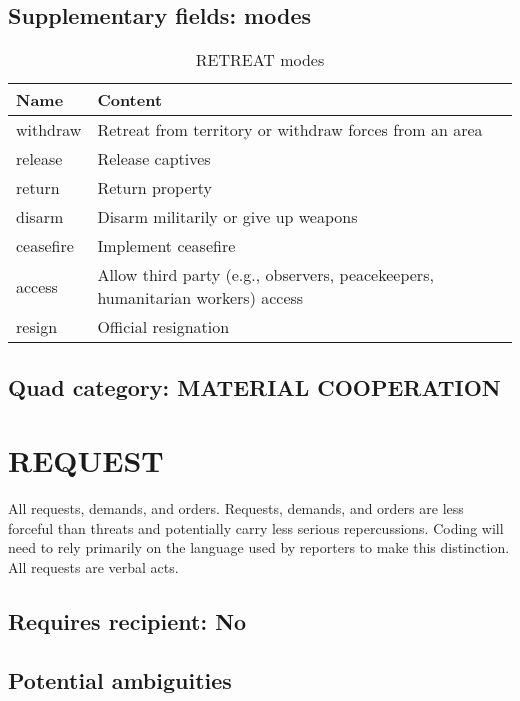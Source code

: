 \documentclass[11pt]{report}
\begin{document}
\subsection{Supplementary fields: modes}

\begin{table}[htp]
\caption{RETREAT modes}
\begin{center}
\begin{tabular}{|l|p{13cm}|}
\hline
Name & Content \\
\hline
withdraw & Retreat from territory or withdraw forces from an area\\
release & Release captives \\
return & Return property \\
disarm & Disarm militarily or give up weapons\\
ceasefire & Implement ceasefire\\
access & Allow third party (e.g., observers, peacekeepers, humanitarian workers) access \\
resign & Official resignation \\
\hline
\end{tabular}
\end{center}
\label{tab:retreatmode}
\end{table}%

\subsection{Quad category: MATERIAL COOPERATION}



\newpage

\section{REQUEST}

All requests, demands, and orders. Requests, demands, and orders are less forceful than threats and potentially carry less serious repercussions. Coding will need to rely primarily on the language used by reporters to make this distinction. All requests are verbal acts.

\subsection{Requires recipient: No}


\subsection{Potential ambiguities}
\end{document}
